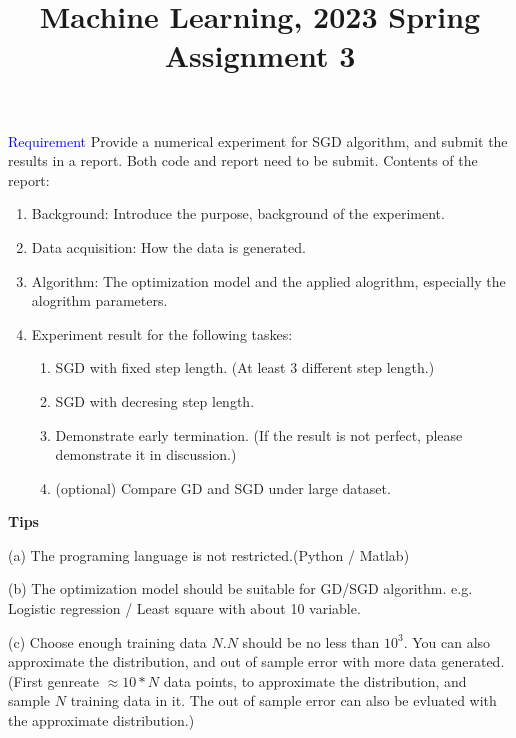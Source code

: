 \documentclass{article}
\title{Machine Learning, 2023 Spring\\Assignment 3}
\begin{document}
\maketitle

\begin{abstract}

\end{abstract}





\textcolor{blue}{Requirement}
Provide a numerical experiment for SGD algorithm, and submit the results in a report. Both code and report need to be submit.
Contents of the report: 
\begin{enumerate}
    \item Background: Introduce the purpose, background of the experiment.
    \item Data acquisition: How the data is generated.
    \item Algorithm: The optimization model and the applied alogrithm, especially the alogrithm parameters.
    \item Experiment result for the following taskes:
    \begin{enumerate}
        \item SGD with fixed step length. (At least 3 different step length.)
        \item SGD with decresing step length.
        \item Demonstrate early termination. (If the result is not perfect, please demonstrate it in discussion.)
        \item (optional) Compare GD and SGD under large dataset.
    \end{enumerate}
    
\end{enumerate}


\textbf{Tips}

    (a) The programing language is not restricted.(Python / Matlab)

    (b) The optimization model should be suitable for GD/SGD algorithm. e.g. Logistic regression / Least square with about 10 variable.

    (c) Choose enough training data $N$.$N$ should be no less than $10^3$. You can also approximate the distribution, and out of sample error with more data generated.
    (First genreate $\approx 10*N $ data points, to approximate the distribution, and sample $N$ training data in it. The out of sample error can also be evluated with the approximate distribution.) 
\end{document}
